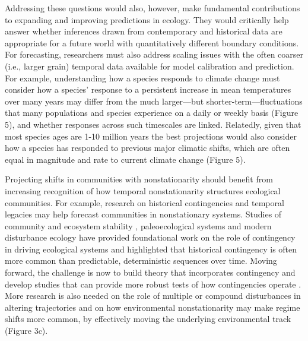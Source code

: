 \documentclass[11pt,a4paper,oneside]{article}
\begin{document}
Addressing these questions would also, however, make fundamental contributions to expanding and improving predictions in ecology. They would critically help answer whether inferences drawn from contemporary and historical data are appropriate for a future world with quantitatively different boundary conditions. For forecasting, researchers must also address scaling issues with the often coarser (i.e., larger grain) temporal data available for model calibration and prediction. For example, understanding how a species responds to climate change must consider how a species' response to a persistent increase in mean temperatures over many years may differ from the much larger---but shorter-term---fluctuations that many populations and species experience on a daily or weekly basis (Figure 5), and whether responses across such timescales are linked. Relatedly, given that most species ages are 1-10 million years \citep{lawtonbook} the best projections would also consider how a species has responded to previous major climatic shifts, which are often equal in magnitude and rate to current climate change (Figure 5).

Projecting shifts in communities with nonstationarity should benefit from increasing recognition of how temporal nonstationarity structures ecological communities. For example, research on historical contingencies and temporal legacies may help forecast communities in nonstationary systems. Studies of community and ecosystem stability \citep{Boettiger2013}, paleoecological systems and modern disturbance ecology have provided foundational work on the role of contingency in driving ecological systems and highlighted that historical contingency is often more common than predictable, deterministic sequences over time. Moving forward, the challenge is now to build theory that incorporates contingency and develop studies that can provide more robust tests of how contingencies operate \citep{vannette2014}. More research is also needed on the role of multiple or compound disturbances in altering trajectories and on how environmental nonstationarity may make regime shifts more common, by effectively moving the underlying environmental track (Figure 3c). %
\end{document}
